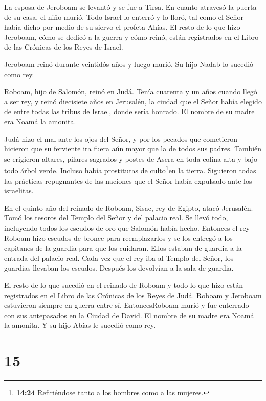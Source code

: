  La esposa de Jeroboam se levantó y se fue a Tirsa. En
cuanto atravesó la puerta de su casa, el niño murió.  Todo
Israel lo enterró y lo lloró, tal como el Señor había dicho por medio de
su siervo el profeta Ahías.  El resto de lo que hizo
Jeroboam, cómo se dedicó a la guerra y cómo reinó, están registrados en
el Libro de las Crónicas de los Reyes de Israel.

 Jeroboam reinó durante veintidós años y luego murió. Su
hijo Nadab lo sucedió como rey.

 Roboam, hijo de Salomón, reinó en Judá. Tenía cuarenta y
un años cuando llegó a ser rey, y reinó diecisiete años en Jerusalén, la
ciudad que el Señor había elegido de entre todas las tribus de Israel,
donde sería honrado. El nombre de su madre era Noamá la amonita.

 Judá hizo el mal ante los ojos del Señor, y por los
pecados que cometieron hicieron que su ferviente ira fuera aún mayor que
la de todos sus padres.  También se erigieron altares,
pilares sagrados y postes de Asera en toda colina alta y bajo todo árbol
verde.  Incluso había prostitutas de culto\footnote{\textbf{14:24}
  Refiriéndose tanto a los hombres como a las mujeres.}en la tierra.
Siguieron todas las prácticas repugnantes de las naciones que el Señor
había expulsado ante los israelitas.

 En el quinto año del reinado de Roboam, Sisac, rey de
Egipto, atacó Jerusalén.  Tomó los tesoros del Templo del
Señor y del palacio real. Se llevó todo, incluyendo todos los escudos de
oro que Salomón había hecho.  Entonces el rey Roboam hizo
escudos de bronce para reemplazarlos y se los entregó a los capitanes de
la guardia para que los cuidaran. Ellos estaban de guardia a la entrada
del palacio real.  Cada vez que el rey iba al Templo del
Señor, los guardias llevaban los escudos. Después los devolvían a la
sala de guardia.

 El resto de lo que sucedió en el reinado de Roboam y todo
lo que hizo están registrados en el Libro de las Crónicas de los Reyes
de Judá.  Roboam y Jeroboam estuvieron siempre en guerra
entre sí.  EntoncesRoboam murió y fue enterrado con sus
antepasados en la Ciudad de David. El nombre de su madre era Noamá la
amonita. Y su hijo Abías le sucedió como rey.

\hypertarget{section-14}{%
\section{15}\label{section-14}}


